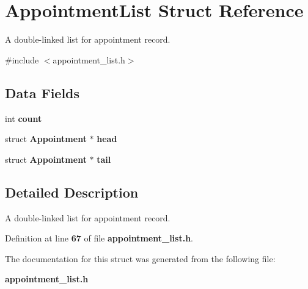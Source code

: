 \section{Appointment\+List Struct Reference}
\label{struct_appointment_list}


A double-\/linked list for appointment record.  




{\ttfamily \#include $<$appointment\+\_\+list.\+h$>$}

\subsection*{Data Fields}
\begin{DoxyCompactItemize}
\item 
int {\bfseries count}\label{struct_appointment_list_ad43c3812e6d13e0518d9f8b8f463ffcf}

\item 
struct {\bf Appointment} $\ast$ {\bfseries head}\label{struct_appointment_list_a2722090ada7089d61838886e5b9b3892}

\item 
struct {\bf Appointment} $\ast$ {\bfseries tail}\label{struct_appointment_list_a01edfd8148278caeea56bc48bcac6930}

\end{DoxyCompactItemize}


\subsection{Detailed Description}
A double-\/linked list for appointment record. 

Definition at line {\bf 67} of file {\bf appointment\+\_\+list.\+h}.



The documentation for this struct was generated from the following file\+:\begin{DoxyCompactItemize}
\item 
{\bf appointment\+\_\+list.\+h}\end{DoxyCompactItemize}

